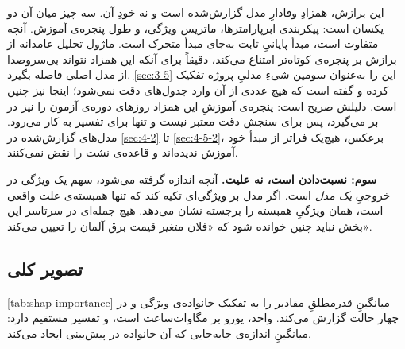 این برازش، همزادِ وفادارِ مدل گزارش‌شده است و نه خودِ آن. سه چیز میان آن دو یکسان
است: پیکربندی ابرپارامترها، ماتریس ویژگی، و طول پنجره‌ی آموزش. آنچه متفاوت است،
مبدأ پایانیِ ثابت به‌جای مبدأ متحرک است. ماژول تحلیل عامدانه از برازش بر پنجره‌ی
کوتاه‌تر امتناع می‌کند، دقیقاً برای آنکه این همزاد نتواند بی‌سروصدا از مدل اصلی
فاصله بگیرد. \cref{sec:3-5} این را به‌عنوان سومین شیءِ مدلیِ پروژه تفکیک کرده و
گفته است که هیچ عددی از آن وارد جدول‌های دقت نمی‌شود؛ اینجا نیز چنین است. دلیلش
صریح است: پنجره‌ی آموزشِ این همزاد روزهای دوره‌ی آزمون را نیز در بر
می‌گیرد، پس برای سنجش دقت معتبر نیست و تنها برای تفسیر به کار می‌رود. مدل‌های
گزارش‌شده در \cref{sec:4-2} تا \cref{sec:4-5-2}، برعکس، هیچ‌یک فراتر از مبدأ خود
آموزش ندیده‌اند و قاعده‌ی نشت را نقض نمی‌کنند.

\textbf{سوم:  نسبت‌دادن است، نه علیت.} آنچه اندازه گرفته می‌شود، سهم یک
ویژگی در خروجیِ \emph{یک مدل} است. اگر مدل بر ویژگی‌ای تکیه کند که تنها همبسته‌ی
علت واقعی است،  همان ویژگیِ همبسته را برجسته نشان می‌دهد. هیچ جمله‌ای در
سرتاسر این بخش نباید چنین خوانده شود که «فلان متغیر قیمت برق آلمان را تعیین می‌کند».

\subsection*{تصویر کلی}

\cref{tab:shap-importance} میانگینِ قدرمطلقِ مقادیر  را به تفکیک
خانواده‌ی ویژگی و در چهار حالت گزارش می‌کند. واحد، یورو بر مگاوات‌ساعت است، و
تفسیر مستقیم دارد: میانگینِ اندازه‌ی جابه‌جایی که آن خانواده در پیش‌بینی ایجاد
می‌کند.

